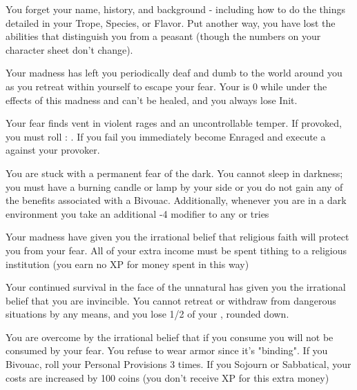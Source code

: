 {  

  You forget your name, history, and background - including how to do the things detailed in your Trope, Species, or Flavor.  Put another way, you have lost the abilities that distinguish you from a peasant (though the numbers on your character sheet don't change).


  Your madness has left you periodically deaf and dumb to the world around you as you retreat within yourself to escape your fear. Your  is 0 while under the effects of this madness and can't be healed, and you always lose Init.


  Your fear finds vent in violent rages and an uncontrollable temper. If provoked, you must roll \RS : \FOC.  If you fail you immediately become Enraged and execute a  against your provoker.


  You are stuck with a permanent fear of the dark. You cannot sleep in darkness; you must have a burning candle or lamp by your side or you do not gain any of the benefits associated with a Bivouac. Additionally, whenever you are in a dark environment you take an additional -4 modifier to any \RO or \RB tries


  Your madness have given you the irrational belief that religious faith will protect you from your fear. All of your extra income must be spent tithing to a religious institution (you earn no XP for money spent in this way)

  \cbreak


  Your continued survival in the face of the unnatural has given you the irrational belief that you are invincible. You cannot retreat or withdraw from dangerous situations by any means, and you lose 1/2 of your , rounded down.


  You are overcome by the irrational belief that if you consume you will not be consumed by your fear. You refuse to wear armor since it's "binding".  If you Bivouac, roll your Personal Provisions 3 times.  If you Sojourn or Sabbatical, your costs are increased by 100 coins (you don't receive XP for this extra money)

}
